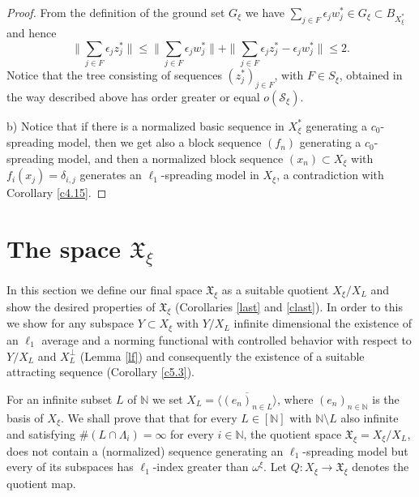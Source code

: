 \documentclass[a4paper]{amsart}
\theoremstyle{plain}
\newcommand{\N}{\mathbb{N}}
\newcommand{\mc}{\mathcal}
\newcommand{\e}{\epsilon}
\begin{document}
\begin{proof}
From the definition of the ground set $G_{\xi}$ we have
$
\sum_{j\in F}\e_{j}w_{j}^{*}\in G_{\xi}\subset B_{X_{\xi}^{*}}
$
and hence
\begin{equation*}\|\sum_{j\in F}\e_{j}z_{j}^{*}\|\leq
\|\sum_{j\in F}\e_{j}w_{j}^{*}\|+\|\sum_{j\in
F}\e_{j}z_{j}^{*}-\e_{j}w_{j}^{*}\| \leq 2.
\end{equation*}
Notice that the tree consisting of sequences $(z_j^*)_{j\in F}$, with $F\in S_\xi$,
obtained in the way described above has order greater or equal $o(\mc{S}_\xi)$.

b) Notice that if there is a normalized basic sequence in $X_\xi^*$ generating a
$c_0$-spreading model, then we get also a block sequence $(f_n)$ generating a
$c_0$-spreading model, and then a normalized block sequence $(x_n)\subset X_\xi$  with
$f_i(x_j)=\delta_{i,j}$ generates an $\ell_{1}$-spreading model in $X_{\xi}$, a
contradiction with Corollary \ref{c4.15}.
\end{proof}
\section{The  space $\mathfrak{X}_{\xi}$}\label{sec13}
In this section we define our final space $\mathfrak{X}_{\xi}$ as a suitable quotient
$X_\xi/X_L$ and show the desired properties of $\mathfrak{X}_{\xi}$ (Corollaries
\ref{last} and \ref{clast}). In order to this we show for any subspace $Y\subset X_\xi$
with $Y/X_L$ infinite dimensional the existence of an $\ell_{1}$ average and a norming
functional with controlled behavior with respect to $Y/X_L$ and $X_L^\perp$ (Lemma
\ref{lf}) and consequently the existence of a suitable attracting sequence (Corollary
\ref{c5.3}).

For an  infinite subset $L$ of $\N$ we set $X_{L}=\overline{\langle(e_{n})_{n\in
L}\rangle}$, where $(e_n)_{n\in\N}$ is the basis of $X_{\xi}$. We shall  prove that that
for every $L\in [\N]$ with $\N\setminus L$ also infinite and  satisfying $\#(L\cap
\Lambda_{i})=\infty$ for every $i\in\N$, the  quotient space
$\mathfrak{X}_{\xi}=X_{\xi}/X_{L}$, does not contain a (normalized) sequence generating
an $\ell_{1}$-spreading model but every of its subspaces has  $\ell_{1}$-index greater
than $\omega^{\xi}$. Let $Q:X_{\xi}\to \mathfrak{X}_{\xi}$ denotes the quotient map.
\end{document}
